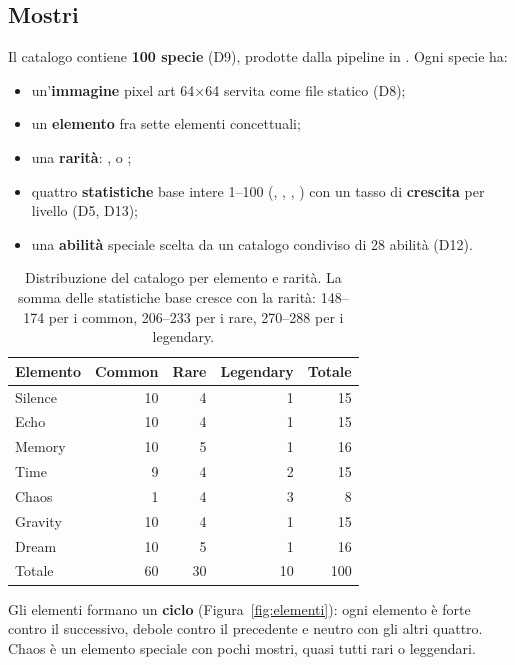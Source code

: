 \documentclass[11pt,a4paper]{article}
\begin{document}
\subsection{Mostri}

Il catalogo contiene \textbf{100 specie} (D9), prodotte dalla pipeline in . Ogni specie ha:
\begin{itemize}
  \item un'\textbf{immagine} pixel art 64×64 servita come file statico (D8);
  \item un \textbf{elemento} fra sette elementi concettuali;
  \item una \textbf{rarità}: ,  o ;
  \item quattro \textbf{statistiche} base intere 1–100 (, , , ) con un tasso di \textbf{crescita} per livello (D5, D13);
  \item una \textbf{abilità} speciale scelta da un catalogo condiviso di 28 abilità (D12).
\end{itemize}

\begin{table}[htbp]
  \centering
  \small
  \begin{tabular}{@{}lrrrr@{}}
    \toprule
    Elemento & Common & Rare & Legendary & Totale \\
    \midrule
    Silence & 10 & 4 & 1 & 15 \\
    Echo    & 10 & 4 & 1 & 15 \\
    Memory  & 10 & 5 & 1 & 16 \\
    Time    &  9 & 4 & 2 & 15 \\
    Chaos   &  1 & 4 & 3 &  8 \\
    Gravity & 10 & 4 & 1 & 15 \\
    Dream   & 10 & 5 & 1 & 16 \\
    \midrule
    Totale  & 60 & 30 & 10 & 100 \\
    \bottomrule
  \end{tabular}
  \caption{Distribuzione del catalogo per elemento e rarità. La somma delle statistiche base cresce con la rarità: 148–174 per i common, 206–233 per i rare, 270–288 per i legendary.}
\end{table}

Gli elementi formano un \textbf{ciclo} (Figura~\ref{fig:elementi}): ogni elemento è forte contro il successivo, debole contro il precedente e neutro con gli altri quattro. Chaos è un elemento speciale con pochi mostri, quasi tutti rari o leggendari.
\end{document}
